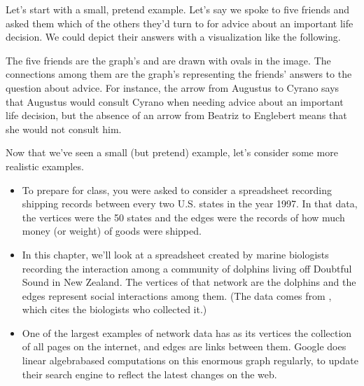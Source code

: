 \documentclass[letterpaper,10pt,english]{jupyterBook}
\begin{document}
\sphinxAtStartPar
Let’s start with a small, pretend example.  Let’s say we spoke to five friends and asked them which of the others they’d turn to for advice about an important life decision.  We could depict their answers with a visualization like the following.

\sphinxAtStartPar
{}

\sphinxAtStartPar
The five friends are the graph’s  and are drawn with ovals in the image.  The connections among them are the graph’s  representing the friends’ answers to the question about advice.  For instance, the arrow from Augustus to Cyrano says that Augustus would consult Cyrano when needing advice about an important life decision, but the absence of an arrow from Beatriz to Englebert means that she would not consult him.

\sphinxAtStartPar
Now that we’ve seen a small (but pretend) example, let’s consider some more realistic examples.
\begin{itemize}
\item {} 
\sphinxAtStartPar
To prepare for class, you were asked to consider a spreadsheet recording shipping records between every two U.S. states in the year 1997.  In that data, the vertices were the 50 states and the edges were the records of how much money (or weight) of goods were shipped.

\item {} 
\sphinxAtStartPar
In this chapter, we’ll look at a spreadsheet created by marine biologists recording the interaction among a community of dolphins living off Doubtful Sound in New Zealand.  The vertices of that network are the dolphins and the edges represent social interactions among them.  (The data comes from , which cites the biologists who collected it.)

\item {} 
\sphinxAtStartPar
One of the largest examples of network data has as its vertices the collection of all pages on the internet, and edges are links between them.  Google does linear algebra\sphinxhyphen{}based computations on this enormous graph regularly, to update their search engine to reflect the latest changes on the web.

\end{itemize}
\end{document}
